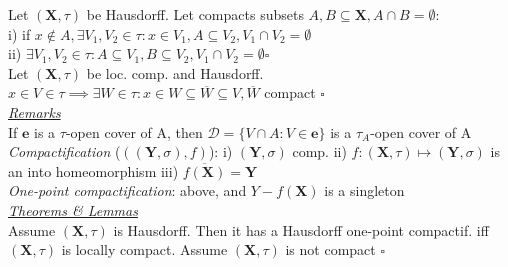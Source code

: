 Let $(\mathbf{X},\tau)$ be Hausdorff. Let compacts subsets $A,B\subseteq\mathbf{X},A\cap B=\emptyset$: \\
i) if $x\notin A,\exists V_1,V_2\in\tau:x\in V_1,A\subseteq V_2,V_1\cap V_2=\emptyset$\\
ii) $\exists V_1,V_2\in\tau:A\subseteq V_1,B\subseteq V_2, V_1\cap V_2=\emptyset \square$\\
Let $(\mathbf{X},\tau)$ be loc. comp. and Hausdorff. $x\in V\in\tau\implies\exists W\in\tau:x\in W\subseteq\overline{W}\subseteq V, \overline{W}$ compact $\square$
\\\underline{\emph{Remarks}}\\
If $\mathbf{e}$ is a $\tau$-open cover of A, then $\mathcal{D}=\{V\cap A:V\in\mathbf{e}\}$ is a $\tau_A$-open cover of A
\emph{Compactification} ($((\mathbf{Y},\sigma), f)$): i) $(\mathbf{Y},\sigma)$ comp. ii) $f:(\mathbf{X},\tau)\mapsto(\mathbf{Y},\sigma)$ is an into homeomorphism iii) $\overline{f(\mathbf{X})}=\mathbf{Y}$\\
\emph{One-point compactification}: above, and $Y-f(\mathbf{X})$ is a singleton
\\\underline{\emph{Theorems \& Lemmas}}\\
Assume $(\mathbf{X},\tau)$ is Hausdorff. Then it has a Hausdorff one-point compactif. iff $(\mathbf{X},\tau)$ is locally compact. Assume $(\mathbf{X},\tau)$ is not compact $\square$

